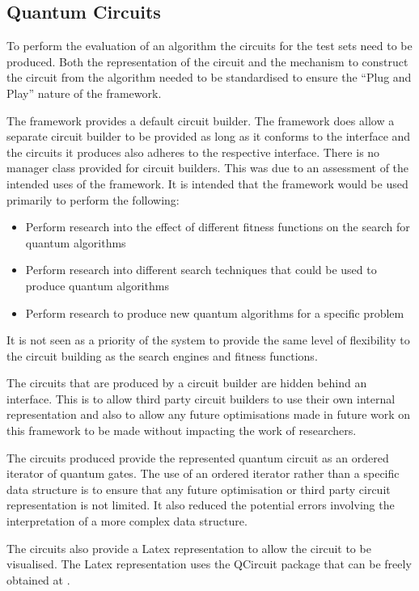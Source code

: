 \documentclass[authoryearcitations]{UoYCSproject}
\begin{document}
\subsection{Quantum Circuits}
To perform the evaluation of an algorithm the circuits for the test sets need to be produced.
Both the representation of the circuit and the mechanism to construct the circuit from the algorithm needed to be standardised to ensure the ``Plug and Play'' nature of the framework.

The framework provides a default circuit builder.
The framework does allow a separate circuit builder to be provided as long as it conforms to the interface and the circuits it produces also adheres to the respective interface.
There is no manager class provided for circuit builders.
This was due to an assessment of the intended uses of the framework.
It is intended that the framework would be used primarily to perform the following:
\begin{itemize}
  \item Perform research into the effect of different fitness functions on the search for quantum algorithms
  \item Perform research into different search techniques that could be used to produce quantum algorithms
  \item Perform research to produce new quantum algorithms for a specific problem
\end{itemize}

It is not seen as a priority of the system to provide the same level of flexibility to the circuit building as the search engines and fitness functions.

The circuits that are produced by a circuit builder are hidden behind an interface.
This is to allow third party circuit builders to use their own internal representation and also to allow any future optimisations made in future work on this framework to be made without impacting the work of researchers.

The circuits produced provide the represented quantum circuit as an ordered iterator of quantum gates.
The use of an ordered iterator rather than a specific data structure is to ensure that any future optimisation or third party circuit representation is not limited.
It also reduced the potential errors involving the interpretation of a more complex data structure.

The circuits also provide a Latex representation to allow the circuit to be visualised.
The Latex representation uses the QCircuit package that can be freely obtained at \cite{QCsite}.
\end{document}
